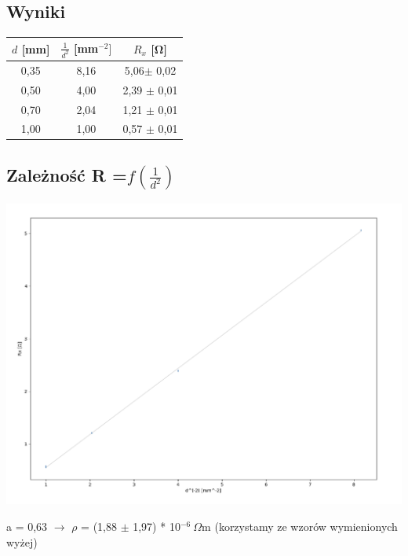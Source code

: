 \documentclass{article}
\begin{document}
\subsection{Wyniki}
\begin{center}
\begin{tabular}{ c|c | c }
$d$ [mm] & $\frac{1}{d^2}$ [mm$^{-2}]$ &$R_x$ [\si{\ohm}]\\
\hline
0,35 & 8,16 & 5,06$\pm$ 0,02\\ 
 0,50 & 4,00 &2,39 $\pm$ 0,01\\ 
 0,70 & 2,04 &1,21 $\pm$ 0,01\\ 
 1,00 & 1,00 &0,57 $\pm$ 0,01\\ 
 
\end{tabular}
\end{center}

\subsection {Zależność R =$ f(\frac{1}{d^2})$}
\begin{center}
\includegraphics[width=15cm]{e3_wykres}
\end{center}
a = 0,63 $\rightarrow$ $\rho$ = (1,88  $\pm$ 1,97) * 10$^{-6} \ \Omega$m (korzystamy ze wzorów wymienionych wyżej)
\end{document}
